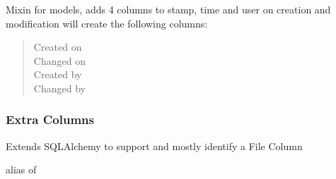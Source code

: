 \documentclass[letterpaper,10pt,english]{sphinxmanual}
\begin{document}
\begin{fulllineitems}
\label{api:flask.ext.appbuilder.models.mixins.BaseMixin}
\end{fulllineitems}


\begin{fulllineitems}
\label{api:flask.ext.appbuilder.models.mixins.AuditMixin}
Mixin for models, adds 4 columns to stamp, time and user on creation and modification
will create the following columns:
\begin{quote}\begin{description}
\item[{Created on}] \leavevmode
\item[{Changed on}] \leavevmode
\item[{Created by}] \leavevmode
\item[{Changed by}] \leavevmode
\end{description}\end{quote}

\end{fulllineitems}



\subsubsection{Extra Columns}
\label{api:extra-columns}

\begin{fulllineitems}
\label{api:flask.ext.appbuilder.models.mixins.FileColumn}
Extends SQLAlchemy to support and mostly identify a File Column

\begin{fulllineitems}
\label{api:flask.ext.appbuilder.models.mixins.FileColumn.impl}
alias of 

\end{fulllineitems}


\end{fulllineitems}
\end{document}
